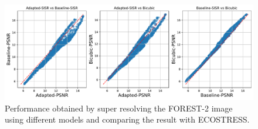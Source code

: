     \begin{figure}[H]
        \centering
        \includegraphics[width=\textwidth]{Includes/5-crossover-performance-scatter.pdf}
        \caption{Performance obtained by super resolving the FOREST-2 image using different models and comparing the result with ECOSTRESS.}
        \label{fig:5-crossover-fft-scatter}
    \end{figure}
        
\newpage
    